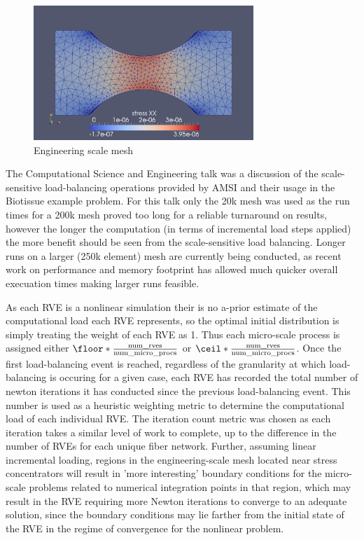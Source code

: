 \begin{figure}
  \begin{center}
    \includegraphics[height=2in]{dogBone14k.png}
  \end{center}
  \caption{\small Engineering scale mesh}
  \label{dogbone_mesh}
\end{figure}

The Computational Science and Engineering talk \cite{wtobin2015cse} was a discussion of the scale-sensitive load-balancing operations provided by AMSI and their usage in the Biotissue example problem. For this talk only the 20k mesh was used as the run times for a 200k mesh proved too long for a reliable turnaround on results, however the longer the computation (in terms of incremental load steps applied) the more benefit should be seen from the scale-sensitive load balancing. Longer runs on a larger (250k element) mesh are currently being conducted, as recent work on performance and memory footprint has allowed much quicker overall execuation times making larger runs feasible.

As each RVE is a nonlinear simulation their is no a-prior estimate of the computational load each RVE represents, so the optimal initial distribution is simply treating the weight of each RVE as 1. Thus each micro-scale process is assigned either $ \floor*{\frac{\text{num\_rves}}{\text{num\_micro\_procs}}} $ or $ \ceil*{\frac{\text{num\_rves}}{\text{num\_micro\_procs}}} $. Once the first load-balancing event is reached, regardless of the granularity at which load-balancing is occuring for a given case, each RVE has recorded the total number of newton iterations it has conducted since the previous load-balancing event. This number is used as a heuristic weighting metric to determine the computational load of each individual RVE. The iteration count metric was chosen as each iteration takes a similar level of work to complete, up to the difference in the number of RVEs for each unique fiber network. Further, assuming linear incremental loading, regions in the engineering-scale mesh located near stress concentrators will result in 'more interesting' boundary conditions for the micro-scale problems related to numerical integration points in that region, which may result in the RVE requiring more Newton iterations to converge to an adequate solution, since the boundary conditions may lie farther from the initial state of the RVE in the regime of convergence for the nonlinear problem.

